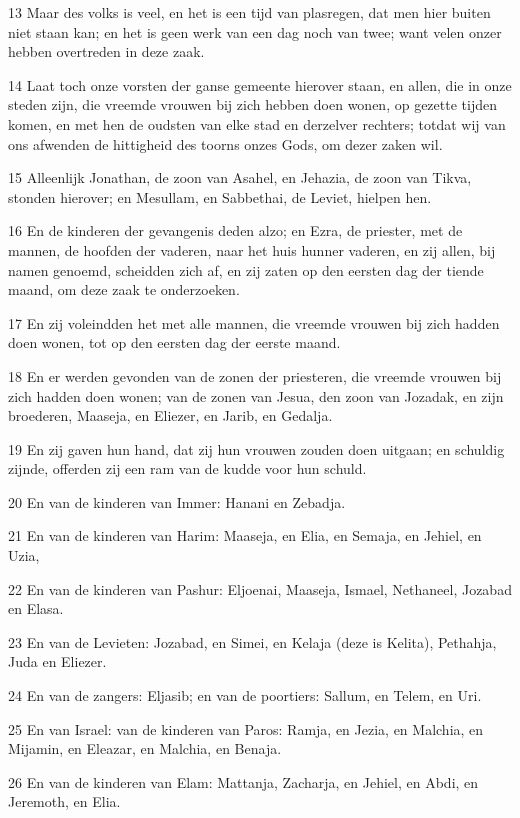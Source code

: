 \par 13 Maar des volks is veel, en het is een tijd van plasregen, dat men hier buiten niet staan kan; en het is geen werk van een dag noch van twee; want velen onzer hebben overtreden in deze zaak.
\par 14 Laat toch onze vorsten der ganse gemeente hierover staan, en allen, die in onze steden zijn, die vreemde vrouwen bij zich hebben doen wonen, op gezette tijden komen, en met hen de oudsten van elke stad en derzelver rechters; totdat wij van ons afwenden de hittigheid des toorns onzes Gods, om dezer zaken wil.
\par 15 Alleenlijk Jonathan, de zoon van Asahel, en Jehazia, de zoon van Tikva, stonden hierover; en Mesullam, en Sabbethai, de Leviet, hielpen hen.
\par 16 En de kinderen der gevangenis deden alzo; en Ezra, de priester, met de mannen, de hoofden der vaderen, naar het huis hunner vaderen, en zij allen, bij namen genoemd, scheidden zich af, en zij zaten op den eersten dag der tiende maand, om deze zaak te onderzoeken.
\par 17 En zij voleindden het met alle mannen, die vreemde vrouwen bij zich hadden doen wonen, tot op den eersten dag der eerste maand.
\par 18 En er werden gevonden van de zonen der priesteren, die vreemde vrouwen bij zich hadden doen wonen; van de zonen van Jesua, den zoon van Jozadak, en zijn broederen, Maaseja, en Eliezer, en Jarib, en Gedalja.
\par 19 En zij gaven hun hand, dat zij hun vrouwen zouden doen uitgaan; en schuldig zijnde, offerden zij een ram van de kudde voor hun schuld.
\par 20 En van de kinderen van Immer: Hanani en Zebadja.
\par 21 En van de kinderen van Harim: Maaseja, en Elia, en Semaja, en Jehiel, en Uzia,
\par 22 En van de kinderen van Pashur: Eljoenai, Maaseja, Ismael, Nethaneel, Jozabad en Elasa.
\par 23 En van de Levieten: Jozabad, en Simei, en Kelaja (deze is Kelita), Pethahja, Juda en Eliezer.
\par 24 En van de zangers: Eljasib; en van de poortiers: Sallum, en Telem, en Uri.
\par 25 En van Israel: van de kinderen van Paros: Ramja, en Jezia, en Malchia, en Mijamin, en Eleazar, en Malchia, en Benaja.
\par 26 En van de kinderen van Elam: Mattanja, Zacharja, en Jehiel, en Abdi, en Jeremoth, en Elia.
